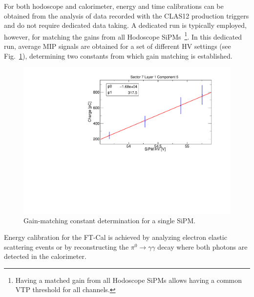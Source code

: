 For both hodoscope and calorimeter, energy and time calibrations can be obtained from the analysis of data recorded with the CLAS12 production triggers and do not require dedicated data taking. A dedicated run is typically employed, however, for matching the gains from all Hodoscope SiPMs~\footnote{Having a matched gain from all Hodoscope SiPMs allows having a common VTP threshold for all channels. }. In this dedicated run, average MIP signals are obtained for a set of different HV settings (see Fig.~\ref{fig:fthodo_gainmatch}), determining two constants from which gain matching is established.
\begin{figure}
\includegraphics[width=1.0\columnwidth]{fig/fthodo_gainmatch.pdf}
\caption{Gain-matching constant determination for a single SiPM.}
\label{fig:fthodo_gainmatch}
\end{figure}


Energy calibration for the FT-Cal is achieved by analyzing electron elastic scattering events or by reconstructing the $\pi^0\to\gamma\gamma$ decay where both photons are detected in the calorimeter. 

